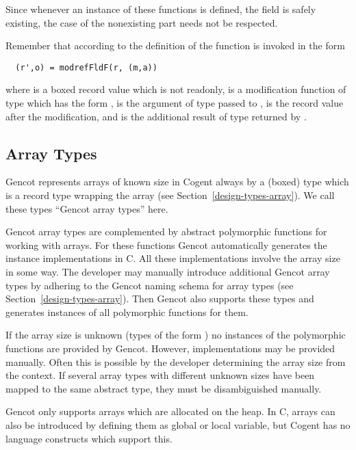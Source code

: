 Since whenever an instance of these functions is defined, the field is safely existing, the case of the nonexisting
part needs not be respected.

Remember that according to the definition of 
 the function  is invoked in the form
\begin{verbatim}
  (r',o) = modrefFldF(r, (m,a))
\end{verbatim}
where  is a boxed record value which is not readonly,  is a modification function of type  which
has the form ,  is the argument of type  passed to ,  is
the record value  after the modification, and  is the additional result of type  returned by .

\subsection{Array Types}
\label{design-operations-array}

Gencot represents arrays of known size in Cogent always by a (boxed) type  which is a record 
type wrapping the array (see Section~\ref{design-types-array}).
We call these types ``Gencot array types'' here.

Gencot array types are complemented by abstract polymorphic functions for working with
arrays. For these functions Gencot automatically generates the instance 
implementations in C. All these implementations involve the array size in some way. The developer may manually introduce
additional Gencot array types by adhering to the Gencot naming schema for array types (see Section~\ref{design-types-array}). 
Then Gencot also supports these types and generates instances of all polymorphic functions for them.

If the array size is unknown (types of the form )
no instances of the polymorphic functions are provided by Gencot. However, implementations may be provided manually. Often
this is possible by the developer determining the array size from the context. If several array types with 
different unknown sizes have been mapped to the same abstract type, they must be disambiguished manually.

Gencot only supports arrays which are allocated on the heap. In C, arrays can also be introduced by defining
them as global or local variable, but Cogent has no language constructs which support this.


